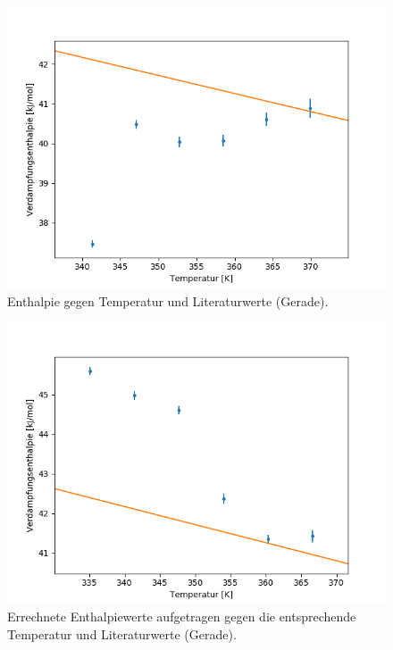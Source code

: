 \documentclass[12pt,a4paper]{article}
\begin{document}
\begin{figure}
\begin{center}
\includegraphics[scale=0.9]{Bilder/Enthalpie_gegen_TempA}
\caption{Enthalpie gegen Temperatur und Literaturwerte (Gerade).}
\label{fig:EntTempA}
\end{center}
\end{figure}

\begin{figure}[H]
\begin{center}
\includegraphics[scale=0.8]{Bilder/Enthalpie_gegen_TempB}
\caption[Enthalpie - Temperatur]{Errechnete Enthalpiewerte aufgetragen gegen die entsprechende Temperatur und Literaturwerte (Gerade).}
\label{fig:EntTempB}
\end{center}
\end{figure}
\end{document}
